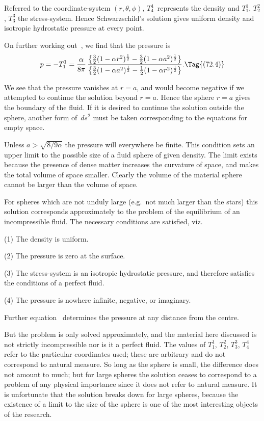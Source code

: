 \documentclass[12pt]{book}
\begin{document}
Referred to the coordinate-system $(r, \theta, \phi)$, $T_{4}^{4}$~represents the density and
$T_{1}^{1}$, $T_{2}^{2}$, $T_{3}^{3}$ the stress-system. Hence Schwarzschild's solution gives uniform
density and isotropic hydrostatic pressure at every point.
%

On further working out~, we find that the pressure is
\[
p = -T_{1}^{1}
= \frac{\alpha}{8\pi}\,
\frac{\bigl\{\frac{3}{2}(1 - \alpha r^{2})^{\frac{1}{2}} - \frac{3}{2}(1 - \alpha a^{2})^{\frac{1}{2}}\bigr\}}
     {\bigl\{\frac{3}{2}(1 - \alpha a^{2})^{\frac{1}{2}} - \frac{1}{2}(1 - \alpha r^{2})^{\frac{1}{2}}\bigr\}}.
\Tag{(72.4)}
\]

We see that the pressure vanishes at $r = a$, and would become negative if
we attempted to continue the solution beyond $r = a$. Hence the sphere $r = a$
gives the boundary of the fluid. If it is desired to continue the solution outside
the sphere, another form of~$ds^{2}$ must be taken corresponding to the
equations for empty space.

Unless $a > \sqrt{8/9\alpha}$ the pressure will everywhere be finite. This condition
sets an upper limit to the possible size of a fluid sphere of given density. The
limit exists because the presence of dense matter increases the curvature of
space, and makes the total volume of space smaller. Clearly the volume of the
material sphere cannot be larger than the volume of space.

For spheres which are not unduly large (e.g.\ not much larger than the
stars) this solution corresponds approximately to the problem of the equilibrium
of an incompressible fluid. The necessary conditions are satisfied, viz.\

(1) The density is uniform.

(2) The pressure is zero at the surface.

(3) The stress-system is an isotropic hydrostatic pressure, and therefore
satisfies the conditions of a perfect fluid.

(4) The pressure is nowhere infinite, negative, or imaginary.

Further equation~ determines the pressure at any distance from the
centre.

But the problem is only solved approximately, and the material here discussed
is not strictly incompressible nor is it a perfect fluid. The values of
$T_{1}^{1}$, $T_{2}^{2}$, $T_{3}^{3}$, $T_{4}^{4}$ refer to the particular coordinates used; these are arbitrary
and do not correspond to natural measure. So long as the sphere is small, the
difference does not amount to much; but for large spheres the solution ceases
to correspond to a problem of any physical importance since it does not refer
to natural measure. It is unfortunate that the solution breaks down for large
spheres, because the existence of a limit to the size of the sphere is one of the
most interesting objects of the research.
\end{document}

